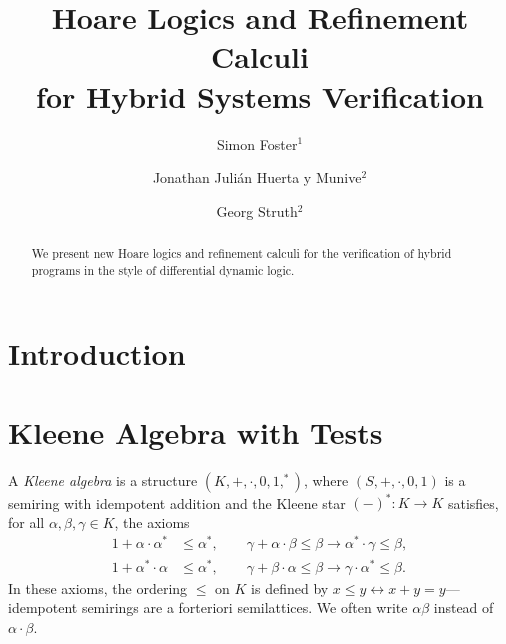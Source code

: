 \documentclass[envcountsames]{llncs}
\begin{document}
\title{Hoare Logics and Refinement Calculi\\ for Hybrid Systems Verification} 

\author{Simon Foster$^1$ \and Jonathan Juli\'an Huerta y Munive$^2$ \and Georg Struth$^2$} 


\maketitle

\begin{abstract} 
  We present new Hoare logics and refinement calculi for the
  verification of hybrid programs in the style of differential dynamic
  logic.
\end{abstract}




\section{Introduction}\label{sec:introduction}


\section{Kleene Algebra with Tests}\label{sec:kat} 

A \emph{Kleene algebra} is a structure $(K,+,\cdot,0,1,^\ast)$, where
$(S,+,\cdot,0,1)$ is a semiring with idempotent addition and the
Kleene star $(-)^\ast:K\to K$ satisfies, for all
$\alpha,\beta,\gamma\in K$, the axioms
\begin{align*} 
1+\alpha\cdot\alpha^\ast &\le \alpha^\ast, \qquad
  \gamma+\alpha\cdot
                                          \beta\le \beta\rightarrow \alpha^\ast \cdot \gamma\le \beta,\\
  1+\alpha^\ast\cdot\alpha &\le \alpha^\ast, \qquad \gamma+\beta\cdot
                             \alpha\le \beta\rightarrow \gamma\cdot
                             \alpha^\ast \le \beta.
\end{align*}
In these axioms, the ordering $\le$ on $K$ is defined by
$x\le y\leftrightarrow x+y=y$---idempotent semirings are a forteriori
semilattices. We often write $\alpha\beta$ instead of
$\alpha\cdot\beta$.
\end{document}
